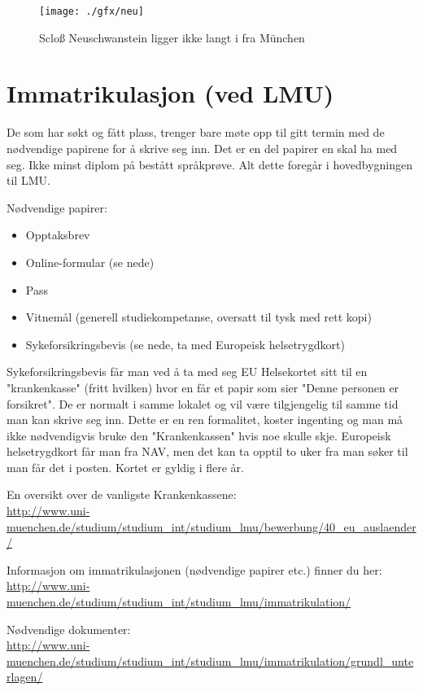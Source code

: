 \begin{figure}[h]
\center
\texttt{[image: ./gfx/neu]}
\caption{Scloß Neuschwanstein ligger ikke langt i fra München}
\end{figure}


\section{Immatrikulasjon (ved LMU)}
De som har søkt og fått plass, trenger bare møte opp til gitt termin med de nødvendige papirene for å skrive seg inn. 
Det er en del papirer en skal ha med seg. Ikke minst diplom på bestått språkprøve. Alt dette foregår i hovedbygningen til LMU.

Nødvendige papirer:
\begin{itemize}
\item Opptaksbrev
\item Online-formular (se nede)
\item Pass
\item Vitnemål (generell studiekompetanse, oversatt til tysk med rett kopi)
\item Sykeforsikringsbevis (se nede, ta med Europeisk helsetrygdkort)
\end{itemize}



Sykeforsikringsbevis får man ved å ta med seg EU Helsekortet sitt til en "krankenkasse" (fritt hvilken) hvor en får et papir som sier "Denne personen er forsikret". De er normalt i samme lokalet og vil være tilgjengelig til samme tid man kan skrive seg inn. Dette er en ren formalitet, koster ingenting og man må ikke nødvendigvis bruke den "Krankenkassen" hvis noe skulle skje. 
Europeisk helsetrygdkort får man fra NAV, men det kan ta opptil to uker fra man søker til man får det i posten. Kortet er gyldig i flere år.

En oversikt over de vanligste Krankenkassene:\\
\url{http://www.uni-muenchen.de/studium/studium_int/studium_lmu/bewerbung/40_eu_auslaender/}

Informasjon om immatrikulasjonen (nødvendige papirer etc.) finner du her:\\
\url{http://www.uni-muenchen.de/studium/studium_int/studium_lmu/immatrikulation/}


Nødvendige dokumenter:\\
\url{http://www.uni-muenchen.de/studium/studium_int/studium_lmu/immatrikulation/grundl_unterlagen/}

